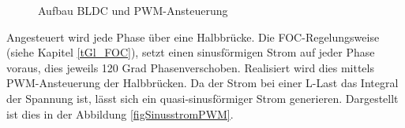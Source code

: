 \begin{figure} [H]
	\caption[BLDC Motor]{Aufbau BLDC und PWM-Ansteuerung}
	\label{fig:BLDC}
\end{figure}

Angesteuert wird jede Phase über eine Halbbrücke. Die FOC-Regelungsweise (siehe Kapitel \ref{tGl_FOC}), setzt einen sinusförmigen Strom auf jeder Phase voraus, dies jeweils 120 Grad \todo{Grad-Zeichen einfügen %
}Phasenverschoben. Realisiert wird dies mittels PWM-Ansteuerung der Halbbrücken. Da der Strom bei einer L-Last das Integral der Spannung ist, lässt sich ein quasi-sinusförmiger Strom generieren. Dargestellt ist dies in der Abbildung \ref{figSinusstromPWM}.

